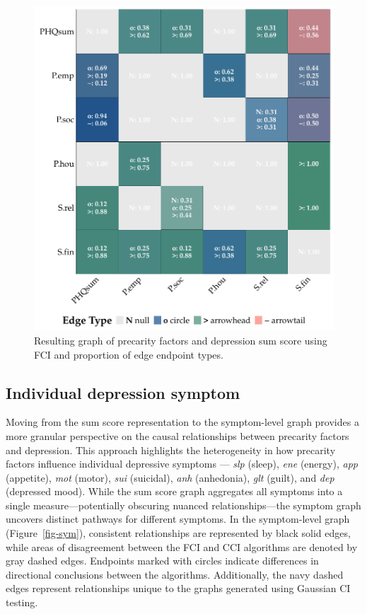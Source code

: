 \documentclass[
]{article}
\begin{document}
\begin{figure}
\begin{minipage}{0.50\linewidth}
{\includegraphics[width=1\textwidth,height=\textheight]{img/depsum_mat_fci.pdf}

}


\end{minipage}%

\caption{\label{fig-sum}Resulting graph of precarity factors and
depression sum score using FCI and proportion of edge endpoint types.}

\end{figure}%

\subsection{Individual depression
symptom}\label{individual-depression-symptom}

Moving from the sum score representation to the symptom-level graph
provides a more granular perspective on the causal relationships between
precarity factors and depression. This approach highlights the
heterogeneity in how precarity factors influence individual depressive
symptoms --- \emph{slp} (sleep), \emph{ene} (energy), \emph{app}
(appetite), \emph{mot} (motor), \emph{sui} (suicidal), \emph{anh}
(anhedonia), \emph{glt} (guilt), and \emph{dep} (depressed mood). While
the sum score graph aggregates all symptoms into a single
measure---potentially obscuring nuanced relationships---the symptom
graph uncovers distinct pathways for different symptoms. In the
symptom-level graph (Figure~\ref{fig-sym}), consistent relationships are
represented by black solid edges, while areas of disagreement between
the FCI and CCI algorithms are denoted by gray dashed edges. Endpoints
marked with circles indicate differences in directional conclusions
between the algorithms. Additionally, the navy dashed edges represent
relationships unique to the graphs generated using Gaussian CI testing.
\end{document}
